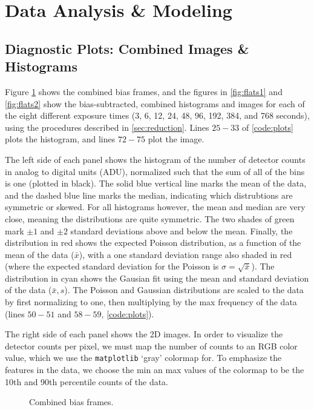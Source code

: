 \documentclass[preprint]{aastex62}
\begin{document}
\section{Data Analysis \& Modeling}

\subsection{Diagnostic Plots: Combined Images \& Histograms} \label{subsec:diagnostic}
Figure \ref{fig:bias} shows the combined bias frames, and the figures in \ref{fig:flats1} and \ref{fig:flats2} show the bias-subtracted, combined histograms and images for each of the eight different exposure times (3, 6, 12, 24, 48, 96, 192, 384, and 768 seconds), using the procedures described in \ref{sec:reduction}. Lines $25-33$ of \ref{code:plots} plots the histogram, and lines $72-75$ plot the image.

The left side of each panel shows the histogram of the number of detector counts in analog to digital units (ADU), normalized such that the sum of all of the bins is one (plotted in black). The solid blue vertical line marks the mean of the data, and the dashed blue line marks the median, indicating which distrubtions are symmetric or skewed. For all histograms however, the mean and median are very close, meaning the distributions are quite symmetric. The two shades of green mark $\pm1$ and $\pm2$ standard deviations above and below the mean. Finally, the distribution in red shows the expected Poisson distribution, as a function of the mean of the data ($\bar{x}$), with a one standard deviation range also shaded in red (where the expected standard deviation for the Poisson is $\sigma=\sqrt{\bar{x}}$). The distribution in cyan shows the Gausian fit using the mean and standard deviation of the data ($\bar{x}, s$). The Poisson and Gaussian distributions are scaled to the data by first normalizing to one, then multiplying by the max frequency of the data (lines $50-51$ and $58-59$, \ref{code:plots}).

The right side of each panel shows the 2D images. In order to visualize the detector counts per pixel, we must map the number of counts to an RGB color value, which we use the {\tt matplotlib} `gray' colormap for. To emphasize the features in the data, we choose the min an max values of the colormap to be the 10th and 90th percentile counts of the data.

\begin{figure}[H]
\caption{Combined bias frames.} \label{fig:bias}{}
\end{figure}
\end{document}
